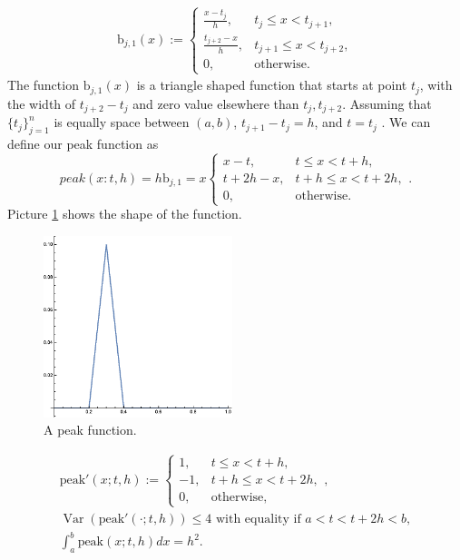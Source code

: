 \documentclass{iitthesis}
\DeclareMathOperator{\Var}{Var}
\theoremstyle{definition}
\theoremstyle{remark}
\begin{document}
\begin{align*}
  \text{b}_{j,1}(x):= \begin{cases} \displaystyle \frac{x-t_{j}}{h}, & t_{j} \le x < t_{j+1},\\[1ex]
\displaystyle \frac{t_{j+2}-x}{h}, & t_{j+1} \le x < t_{j+2},\\[1ex]
\displaystyle  0, & \text{otherwise}.
\end{cases}
\end{align*}
The function $\text{b}_{j,1}(x)$ is a triangle shaped function that starts at point $t_j$, with the width of $t_{j+2}-t_{j}$ and zero value elsewhere than $t_{j}, t_{j+2}$. Assuming that $\{t_{j}\}_{j=1}^{n}$ is equally space between $(a,b)$, $t_{j+1}-t_{j}=h$, and $t=t_{j}$ . We can define our peak function as
\begin{equation}\label{peakfunction}
  peak(x:t,h)=h \text{b}_{j,1}=x\begin{cases} \displaystyle x-t, & t \le x < t+h,\\[1ex]
\displaystyle t+2h-x, & t+h \le x < t+2h,\\[1ex]
\displaystyle  0, & \text{otherwise}.
\end{cases}.
\end{equation}
Picture \ref{fig:peakfunction} shows the shape of the function.
\begin{figure}
\centering
\includegraphics[width=5.5cm]{peak.eps}
\caption{A peak function. \label{fig:peakfunction}}
\end{figure}
\begin{gather*}
  \text{peak}'(x;t,h):= \begin{cases} \displaystyle 1, & t \le x < t+h,\\[1ex]
\displaystyle -1, & t+h \le x < t+2h,\\[1ex]
\displaystyle  0, & \text{otherwise},
\end{cases}, \\
\Var(\text{peak}'(\cdot;t,h))\le 4 \text{ with equality if } a<t<t+2h<b, \\
\int_{a}^{b}\text{peak}(x;t,h)dx=h^2.
\end{gather*}
\end{document}
